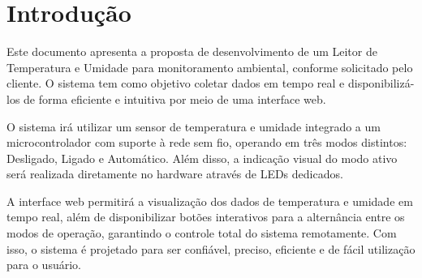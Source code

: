 \section{Introdução}

Este documento apresenta a proposta de desenvolvimento de um Leitor de Temperatura e Umidade para monitoramento ambiental, conforme solicitado pelo cliente. O sistema tem como objetivo coletar dados em tempo real e disponibilizá-los de forma eficiente e intuitiva por meio de uma interface web.

O sistema irá utilizar um sensor de temperatura e umidade integrado a um microcontrolador com suporte à rede sem fio, operando em três modos distintos: Desligado, Ligado e Automático. Além disso, a indicação visual do modo ativo será realizada diretamente no hardware através de LEDs dedicados.

A interface web permitirá a visualização dos dados de temperatura e umidade em tempo real, além de disponibilizar botões interativos para a alternância entre os modos de operação, garantindo o controle total do sistema remotamente. Com isso, o sistema é projetado para ser confiável, preciso, eficiente e de fácil utilização para o usuário.